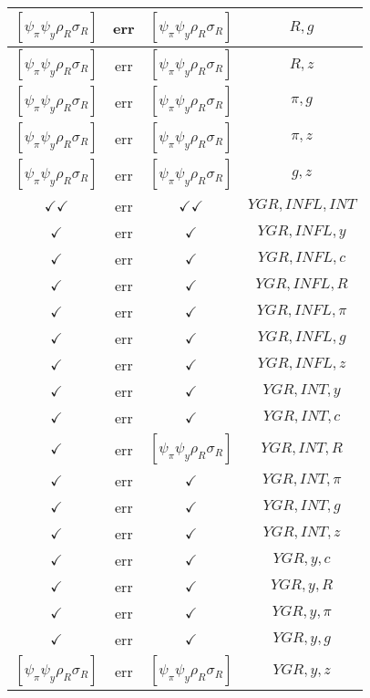 \documentclass[a4paper,10pt]{article}
\begin{document}
\begin{longtable}{|c|c|c|c|}
$[\psi_\pi \psi_y \rho_R \sigma_R ]$ & err & $[\psi_\pi \psi_y \rho_R \sigma_R ]$ & ${R},{g}$ \\
\hline
$[\psi_\pi \psi_y \rho_R \sigma_R ]$ & err & $[\psi_\pi \psi_y \rho_R \sigma_R ]$ & ${R},{z}$ \\
\hline
$[\psi_\pi \psi_y \rho_R \sigma_R ]$ & err & $[\psi_\pi \psi_y \rho_R \sigma_R ]$ & ${\pi},{g}$ \\
\hline
$[\psi_\pi \psi_y \rho_R \sigma_R ]$ & err & $[\psi_\pi \psi_y \rho_R \sigma_R ]$ & ${\pi},{z}$ \\
\hline
$[\psi_\pi \psi_y \rho_R \sigma_R ]$ & err & $[\psi_\pi \psi_y \rho_R \sigma_R ]$ & ${g},{z}$ \\
\hline
$\checkmark\checkmark$ & err & $\checkmark\checkmark$ & ${YGR},{INFL},{INT}$ \\
\hline
$\checkmark$ & err & $\checkmark$ & ${YGR},{INFL},{y}$ \\
\hline
$\checkmark$ & err & $\checkmark$ & ${YGR},{INFL},{c}$ \\
\hline
$\checkmark$ & err & $\checkmark$ & ${YGR},{INFL},{R}$ \\
\hline
$\checkmark$ & err & $\checkmark$ & ${YGR},{INFL},{\pi}$ \\
\hline
$\checkmark$ & err & $\checkmark$ & ${YGR},{INFL},{g}$ \\
\hline
$\checkmark$ & err & $\checkmark$ & ${YGR},{INFL},{z}$ \\
\hline
$\checkmark$ & err & $\checkmark$ & ${YGR},{INT},{y}$ \\
\hline
$\checkmark$ & err & $\checkmark$ & ${YGR},{INT},{c}$ \\
\hline
$\checkmark$ & err & $[\psi_\pi \psi_y \rho_R \sigma_R ]$ & ${YGR},{INT},{R}$ \\
\hline
$\checkmark$ & err & $\checkmark$ & ${YGR},{INT},{\pi}$ \\
\hline
$\checkmark$ & err & $\checkmark$ & ${YGR},{INT},{g}$ \\
\hline
$\checkmark$ & err & $\checkmark$ & ${YGR},{INT},{z}$ \\
\hline
$\checkmark$ & err & $\checkmark$ & ${YGR},{y},{c}$ \\
\hline
$\checkmark$ & err & $\checkmark$ & ${YGR},{y},{R}$ \\
\hline
$\checkmark$ & err & $\checkmark$ & ${YGR},{y},{\pi}$ \\
\hline
$\checkmark$ & err & $\checkmark$ & ${YGR},{y},{g}$ \\
\hline
$[\psi_\pi \psi_y \rho_R \sigma_R ]$ & err & $[\psi_\pi \psi_y \rho_R \sigma_R ]$ & ${YGR},{y},{z}$ \\

\end{longtable}
\end{document}
